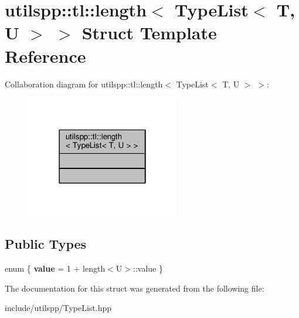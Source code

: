 \hypertarget{structutilspp_1_1tl_1_1length_3_01TypeList_3_01T_00_01U_01_4_01_4}{\section{utilspp\-:\-:tl\-:\-:length$<$ Type\-List$<$ T, U $>$ $>$ Struct Template Reference}
\label{structutilspp_1_1tl_1_1length_3_01TypeList_3_01T_00_01U_01_4_01_4}
}


Collaboration diagram for utilspp\-:\-:tl\-:\-:length$<$ Type\-List$<$ T, U $>$ $>$\-:\nopagebreak
\begin{figure}[H]
\begin{center}
\leavevmode
\includegraphics[width=190pt]{structutilspp_1_1tl_1_1length_3_01TypeList_3_01T_00_01U_01_4_01_4__coll__graph}
\end{center}
\end{figure}
\subsection*{Public Types}
\begin{DoxyCompactItemize}
\item 
enum \{ {\bfseries value} = 1 + length$<$U$>$\-:\-:value
 \}
\end{DoxyCompactItemize}


The documentation for this struct was generated from the following file\-:\begin{DoxyCompactItemize}
\item 
include/utilspp/Type\-List.\-hpp\end{DoxyCompactItemize}
